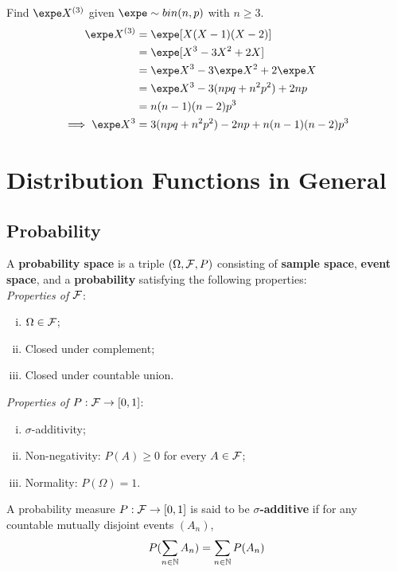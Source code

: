 \documentclass{article}
\begin{document}
   	\begin{example}
   		Find $\expe X^{(3)}$ given $\expe \sim bin(n, p)$ with $n \geq 3$.
   		\begin{align}
   			\expe X^{(3)} &= \expe[X(X-1)(X-2)] \\
   			&= \expe [X^3 - 3X^2 + 2X] \\
   			&= \expe X^3 - 3 \expe X^2 + 2 \expe X \\
   			&= \expe X^3 - 3 (npq + n^2 p^2) + 2 np \\
   			&= n(n-1)(n-2) p^3 \\
   			\implies \expe X^3 &= 3 (npq + n^2 p^2) - 2 np + n(n-1)(n-2) p^3
   		\end{align}
   	\end{example}
 
   	\section{Distribution Functions in General}
   	\subsection{Probability}
   	\begin{definition}
   		A \textbf{probability space} is a triple $(\Omega, \mathcal{{F}}, P)$ consisting of \textbf{sample space}, \textbf{event space}, and a \textbf{probability} satisfying the following properties: \\
   		\emph{Properties of $\mathcal{{F}}$}:
   		\begin{enumerate}[(i)]
   			\item $\Omega \in \mathcal{{F}}$;
   			\item Closed under complement;
   			\item Closed under countable union.
   		\end{enumerate}
   		\emph{Properties of $P: \mathcal{{F}} \to [0, 1]$}: 
   		\begin{enumerate}[(i)]
   			\item $\sigma$-additivity;
   			\item Non-negativity: $P(A) \geq 0$ for every $A \in \mathcal{{F}}$;
   			\item Normality: $P(\Omega) = 1$.
   		\end{enumerate}
   	\end{definition}
   	
   	\begin{definition}
   		A probability measure $P: \mathcal{{F}} \to [0, 1]$ is said to be \textbf{$\sigma$-additive} if for any countable mutually disjoint events $(A_n)$,
   		\begin{align}
   			P(\sum_{n \in \mathbb{N}} A_n) = \sum_{n \in \mathbb{N}} P(A_n)
   		\end{align}
   	\end{definition}
   	
\end{document}
